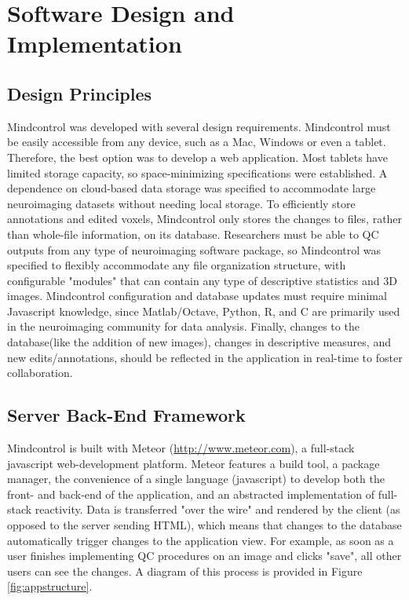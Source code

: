 \section{Software Design and Implementation}

\subsection{Design Principles}
Mindcontrol was developed with several design requirements. Mindcontrol must be easily accessible from any device, such as a Mac, Windows or even a tablet. Therefore, the best option was to develop a web application. Most tablets have limited storage capacity, so space-minimizing specifications were established. A dependence on cloud-based data storage was specified to accommodate large neuroimaging datasets without needing local storage. To efficiently store annotations and edited voxels, Mindcontrol only stores the changes to files, rather than whole-file information, on its database. Researchers must be able to QC outputs from any type of neuroimaging software package, so Mindcontrol was specified to flexibly accommodate any file organization structure, with configurable "modules" that can contain any type of descriptive statistics and 3D images. Mindcontrol configuration and database updates must require minimal Javascript knowledge, since Matlab/Octave, Python, R, and C are primarily used in the neuroimaging community for data analysis. Finally, changes to the database(like the addition of new images), changes in descriptive measures, and new edits/annotations, should be reflected in the application in real-time to foster collaboration.  


\subsection{Server Back-End Framework}

Mindcontrol is built with Meteor (\href{http://www.meteor.com}{http://www.meteor.com}), a full-stack javascript web-development platform. Meteor features a build tool, a package manager, the convenience of a single language (javascript) to develop both the front- and back-end of the application, and an abstracted implementation of full-stack reactivity. Data is transferred "over the wire" and rendered by the client (as opposed to the server sending HTML), which means that changes to the database automatically trigger changes to the application view. For example, as soon as a user finishes implementing QC procedures on an image and clicks "save", all other users can see the changes. A diagram of this process is provided in Figure \ref{fig:appstructure}.



